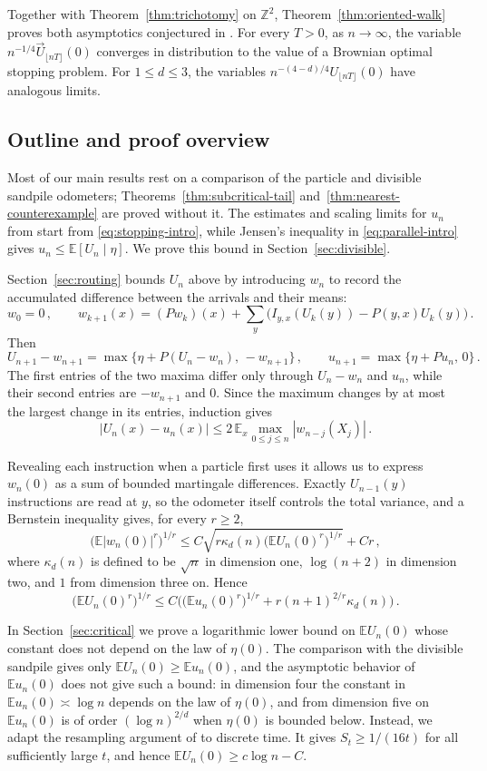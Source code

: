 \documentclass[11pt]{amsart}
\theoremstyle{plain}
\theoremstyle{definition}
\newcommand{\Z}{\mathbb{Z}}
\newcommand{\E}{\mathbb{E}}
\begin{document}
Together with Theorem~\ref{thm:trichotomy} on $\Z^2$, Theorem~\ref{thm:oriented-walk} proves both asymptotics conjectured in
\citet[Open Question~1]{DGJLS}. For every $T>0$, as $n\to\infty$, the variable
$n^{-1/4}\vec U_{\lfloor nT\rfloor}(0)$ converges in distribution to the
value of a Brownian optimal stopping problem. For $1\leq d\leq3$, the variables
$n^{-(4-d)/4}U_{\lfloor nT\rfloor}(0)$ have analogous limits.

\subsection{Outline and proof overview}\label{ssec:method}

Most of our main results rest on a comparison of the particle and divisible
sandpile odometers; Theorems~\ref{thm:subcritical-tail}
and~\ref{thm:nearest-counterexample} are proved without it. The estimates and scaling limits for
$u_n$ from \citet{BP} start from \eqref{eq:stopping-intro}, while Jensen's
inequality in \eqref{eq:parallel-intro} gives
$u_n\leq\E[U_n\mid\eta]$. We prove this bound in
Section~\ref{sec:divisible}.

Section~\ref{sec:routing} bounds $U_n$ above by introducing $w_n$ to record the
accumulated difference between the arrivals and their means:
\[
	w_0=0\,,\qquad
	w_{k+1}(x)=(Pw_k)(x)+\sum_y\bigl(I_{y,x}(U_k(y))-P(y,x)U_k(y)\bigr)\,.
\]
Then
\[
	U_{n+1}-w_{n+1}=\max\bigl\{\eta+P(U_n-w_n),\,-w_{n+1}\bigr\}\,,
	\qquad
	u_{n+1}=\max\{\eta+Pu_n,\,0\}\,.
\]
The first entries of the two maxima differ only through $U_n-w_n$ and $u_n$,
while their second entries are $-w_{n+1}$ and $0$. Since the maximum changes by at most the largest change in its entries, induction gives
\[
	|U_n(x)-u_n(x)|\leq2\,\E_x\max_{0\leq j\leq n}|w_{n-j}(X_j)|\,.
\]

Revealing each instruction when a particle first uses it allows us to express $w_n(0)$ as a sum
of bounded martingale differences. Exactly $U_{n-1}(y)$ instructions are read at
$y$, so the odometer itself controls the total variance, and a Bernstein
inequality gives, for every $r\geq2$,
\[
	\bigl(\E|w_n(0)|^r\bigr)^{1/r}\leq
	C\sqrt{r\kappa_d(n)\bigl(\E U_n(0)^r\bigr)^{1/r}}+Cr\,,
\]
where $\kappa_d(n)$ is defined to be $\sqrt n$ in dimension one, $\log(n+2)$ in dimension
two, and $1$ from dimension three on. Hence
\[
	\bigl(\E U_n(0)^r\bigr)^{1/r}\leq
	C\bigl(\bigl(\E u_n(0)^r\bigr)^{1/r}+r(n+1)^{2/r}\kappa_d(n)\bigr)\,.
\]

In Section~\ref{sec:critical} we prove a logarithmic lower bound on $\E
U_n(0)$ whose constant does not depend on the law of $\eta(0)$. The comparison with the divisible sandpile
gives only $\E U_n(0)\geq\E u_n(0)$, and the asymptotic behavior of $\E u_n(0)$ does not give such a bound: in
dimension four the constant in $\E u_n(0)\asymp\log n$ depends on the law of
$\eta(0)$, and from dimension five on $\E u_n(0)$ is of order $(\log n)^{2/d}$
when $\eta(0)$ is bounded below. Instead, we adapt the resampling argument of \citet{CRS} to discrete time. It
gives $S_t\geq1/(16t)$ for all sufficiently large $t$, and hence
$\E U_n(0)\geq c\log n-C$.
\end{document}
